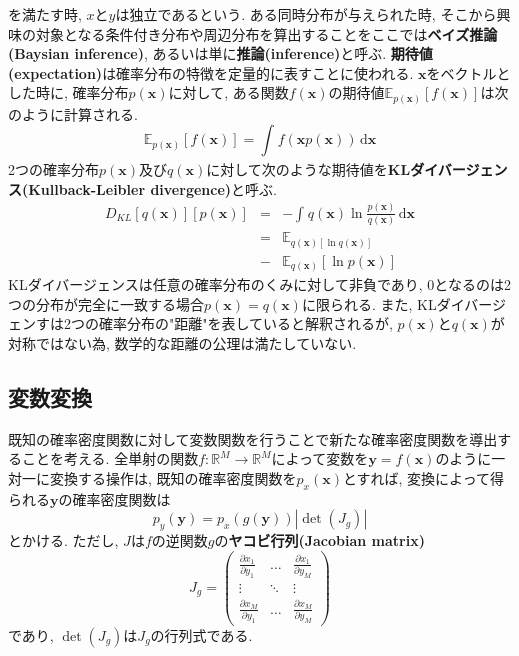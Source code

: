 \documentclass[twocolumn]{jarticle}
\begin{document}
を満たす時, ${x}$と${y}$は独立であるという.
ある同時分布が与えられた時, そこから興味の対象となる条件付き分布や周辺分布を算出することをここでは{\bf ベイズ推論(Baysian inference)}, あるいは単に{\bf 推論(inference)}と呼ぶ.
{\bf 期待値(expectation)}は確率分布の特徴を定量的に表すことに使われる. ${\bm {x}}$をベクトルとした時に, 確率分布${p(\bm {x})}$に対して, ある関数${f(\bm {x})}$の期待値${\mathbb{E}_{p(\bm {x})} [f(\bm {x})]}$は次のように計算される.
\begin{equation}
  \mathbb{E}_{p(\bm {x})} [f(\bm {x})] = \int_{}^{} f(\bm {x}p(\bm {x})) \,\mathrm{d}{\bm x}
\end{equation}
2つの確率分布${p(\bm {x})}$及び${q(\bm {x})}$に対して次のような期待値を{\bf KLダイバージェンス(Kullback-Leibler divergence)}と呼ぶ.
\begin{eqnarray}
  D_{KL}[q(\bm {x})][p(\bm {x})] &=& - \int_{}^{} q(\bm {x}) \ln \frac{p(\bm {x})}{q(\bm {x})}  \,\mathrm{d}{\bm {x}} \nonumber \\
  &=& \mathbb{E}_{q(\bm {x})[\ln q(\bm {x})]} \nonumber \\
  &-& \mathbb{E}_{q(\bm {x})}[\ln p(\bm {x})]
\end{eqnarray}
KLダイバージェンスは任意の確率分布のくみに対して非負であり, 0となるのは2つの分布が完全に一致する場合${p(\bm {x}) = q(\bm {x})}$に限られる. また, KLダイバージェンすは2つの確率分布の"距離"を表していると解釈されるが, ${p(\bm {x})}$と${q(\bm {x})}$が対称ではない為, 数学的な距離の公理は満たしていない.

\subsection{変数変換}
既知の確率密度関数に対して変数関数を行うことで新たな確率密度関数を導出することを考える. 全単射の関数${f : \mathbb{R}^M \to \mathbb{R}^M}$によって変数を${\bm {y} = f(\bm {x})}$のように一対一に変換する操作は, 既知の確率密度関数を${p_{x}(\bm {x})}$とすれば, 変換によって得られる${\bm {y}}$の確率密度関数は
\begin{equation}
  p_y(\bm {y}) = p_x(g(\bm {y})) \left\lvert \det (J_g)\right\rvert
\end{equation}
とかける. ただし, ${J}$は${f}$の逆関数${g}$の{\bf ヤコビ行列(Jacobian matrix)}
\begin{equation}
  J_g = \left(
    \begin{array}{ccc}
      \frac{\partial x_1}{\partial y_1} & \ldots & \frac{\partial x_1}{\partial y_M} \\
      \vdots & \ddots & \vdots \\
      \frac{\partial x_M}{\partial y_1} & \ldots & \frac{\partial x_M}{\partial y_M}
    \end{array}
  \right)
\end{equation}
であり, ${\det (J_g)}$は${J_g}$の行列式である.
\end{document}
